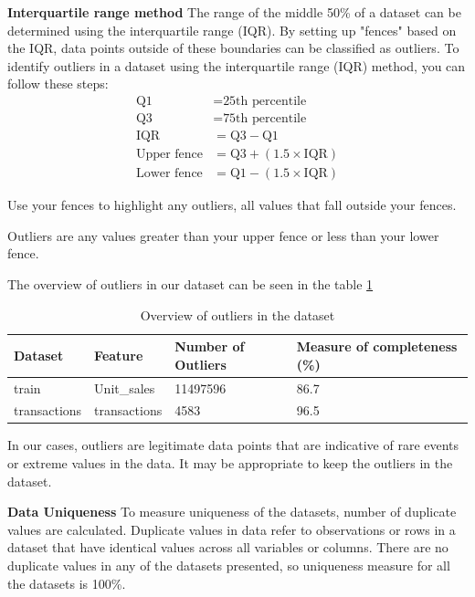 	\textbf{Interquartile range method}
	The range of the middle 50\% of a dataset can be determined using the interquartile range (IQR). By setting up "fences" based on the IQR, data points outside of these boundaries can be classified as outliers.
	To identify outliers in a dataset using the interquartile range (IQR) method, you can follow these steps:
	\begin{align*}
		\text{Q1} &= \text{25th percentile} \\
		\text{Q3} &= \text{75th percentile} \\
		\text{IQR} &= \text{Q3} - \text{Q1} \\
		\text{Upper fence} &= \text{Q3} + (1.5 \times \text{IQR}) \\
		\text{Lower fence} &= \text{Q1} - (1.5 \times \text{IQR})
	\end{align*}
	
	Use your fences to highlight any outliers, all values that fall outside your fences. 
	
	Outliers are any values greater than your upper fence or less than your lower fence.
	
	The overview of outliers in our dataset can be seen in the table \ref{tab:DatasetOutliers}
	\begin{table}[h!]
		\centering
		\caption{Overview of outliers in the dataset}
		\label{tab:DatasetOutliers}
		\begin{tabular}{|l|l|l|p{3cm}|}
			\hline
			\textbf{Dataset} & \textbf{Feature} & \textbf{Number of Outliers} & \textbf{Measure of completeness (\%)} \\ \hline
			train & Unit\_sales & 11497596 & 86.7 \\ \hline
			transactions & transactions & 4583 & 96.5 \\ \hline
		\end{tabular}
	\end{table}
	
	In our cases, outliers are legitimate data points that are indicative of rare events or extreme values in the data. It may be appropriate to keep the outliers in the dataset.
	
	\textbf{Data Uniqueness}
	To measure uniqueness of the datasets, number of duplicate values are calculated. Duplicate values in data refer to observations or rows in a dataset that have identical values across all variables or columns. There are no duplicate values in any of the datasets presented, so uniqueness measure for all the datasets is 100\%.
	
